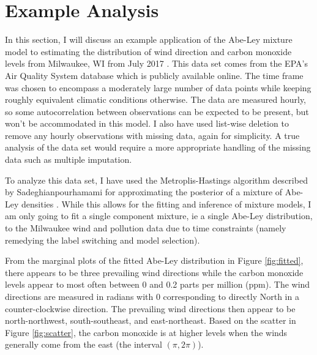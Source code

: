 \section{Example Analysis}\label{ex_sec}

In this section, I will discuss an example application of the Abe-Ley mixture model to estimating the distribution of wind direction and carbon monoxide levels from Milwaukee, WI from July 2017 \cite{abe_tractable_2017}\cite{sadeghianpourhamami_bayesian_2019}\cite{noauthor_airdata_nodate}. This data set comes from the EPA's Air Quality System database which is publicly available online. The time frame was chosen to encompass a moderately large number of data points while keeping roughly equivalent climatic conditions otherwise. The data are measured hourly, so some autocorrelation between observations can be expected to be present, but won't be accommodated in this model. I also have used list-wise deletion to remove any hourly observations with missing data, again for simplicity. A true analysis of the data set would require a more appropriate handling of the missing data such as multiple imputation. 

To analyze this data set, I have used the Metroplis-Hastings algorithm described by Sadeghianpourhamami for approximating the posterior of a mixture of Abe-Ley densities \cite{sadeghianpourhamami_bayesian_2019}. While this allows for the fitting and inference of mixture models, I am only going to fit a single component mixture, ie a single Abe-Ley distribution, to the Milwaukee wind and pollution data due to time constraints (namely remedying the label switching and model selection). 

From the marginal plots of the fitted Abe-Ley distribution in Figure \ref{fig:fitted}, there appears to be three prevailing wind directions while the carbon monoxide levels appear to most often between 0 and 0.2 parts per million (ppm). The wind directions are measured in radians with 0 corresponding to directly North in a counter-clockwise direction. The prevailing wind directions then appear to be north-northwest, south-southeast, and east-northeast. Based on the scatter in Figure \ref{fig:scatter}, the carbon monoxide is at higher levels when the winds generally come from the east (the interval $(\pi, 2\pi)$). 

